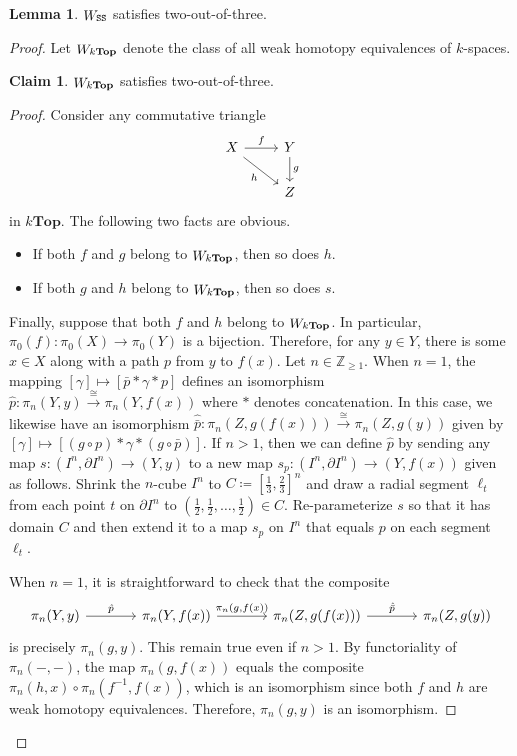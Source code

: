 \documentclass[10pt,letterpaper,cm]{nupset}
\theoremstyle{definition}
\theoremstyle{theorem}
\newtheorem{lemma}[definition]{Lemma}
\newtheorem*{claim}{Claim}
\theoremstyle{remark}
\newcommand{\Z}{\mathbb Z}
\newcommand{\0}{\mathbf{0}}
\newcommand{\1}{\mathbf{1}}
\newcommand{\2}{\mathbf{2}}
\DeclareMathOperator{\we}{\mathnormal{W}}
\newcommand{\bi}{\begin{itemize}}
\newcommand{\ei}{\end{itemize}}
\begin{document}
\smallskip

\begin{lemma}\label{SS23}
$\we_{\mathtt{SS}}$ satisfies two-out-of-three.
\end{lemma}
\begin{proof}
Let $\we_{k\mathbf{Top}}$ denote the class of all weak homotopy equivalences of $k$-spaces.
\begin{claim} 
 $\we_{k\mathbf{Top}}$ satisfies  two-out-of-three.
\end{claim}
\begin{proof} 
Consider any commutative triangle
\[
\begin{tikzcd}
X \arrow[r, "f"] \arrow[rd, "h"'] & Y \arrow[d, "g"] \\
                                  & Z               
\end{tikzcd}
\] in $k\mathbf{Top}$. 
The following two facts are obvious.
\bi
\item If both $f$ and $g$ belong to $\we_{k\mathbf{Top}}$, then so does $h$. 
\item If both $g$ and $h$ belong to $\we_{k\mathbf{Top}}$, then so does $s$. 
\ei
Finally, suppose that both $f$ and $h$ belong to $\we_{k\mathbf{Top}}$. In particular, $\pi_0(f) : \pi_0(X) \to \pi_0(Y)$ is a bijection. Therefore, for any $y\in Y$, there is some $x\in X$ along with a path $p$ from $y$ to $f(x)$. Let $n\in \Z_{\geq 1}$. When $n=1$, the mapping $\left[\gamma\right] \mapsto \left[\bar{p}\ast \gamma \ast p\right]$ defines an isomorphism $\hat{p} : \pi_n(Y, y) \overset{\cong}{\longrightarrow} \pi_n(Y, f(x))$ where $\ast$ denotes concatenation. In this case, we likewise have an isomorphism $\hat{\bar{p}} : \pi_n(Z, g(f(x))) \overset{\cong}{\longrightarrow} \pi_n(Z, g(y))$ given by $\left[\gamma\right] \mapsto \left[\left(g\circ {p}\right)\ast \gamma \ast \left( g \circ \bar{p}\right)\right]$. If $n>1$, then we can define $\hat{p}$ by sending any map $s: \left(I^n, \partial{I^n}\right) \to \left(Y, y\right)$ to a new map $s_p : \left(I^n, \partial{I^n}\right) \to \left(Y, f(x)\right)$ given as follows. Shrink the $n$-cube $I^n$ to  $C\coloneqq \left[\frac{1}{3}, \frac{2}{3}\right]^n$ and draw a radial segment $\ell_t$ from each point $t$ on $\partial{I^n}$ to $\left(\frac{1}{2}, \frac{1}{2}, \ldots, \frac{1}{2}\right)\in C$. Re-parameterize  $s$ so that it has domain $C$ and then extend it to a map $s_p$ on $I^n$ that equals $p$ on each segment $\ell_t$.

\medskip

When $n=1$, it is straightforward to check that the composite
\[
\begin{tikzcd}[column sep=large]
{\pi_n(Y,y)} \arrow[r, "\hat{p}"] & {\pi_n(Y, f(x))} \arrow[r, "{\pi_n(g, f(x))}"] & {\pi_n(Z, g(f(x)))} \arrow[r, "\hat{\bar{p}}"] & {\pi_n(Z, g(y))}
\end{tikzcd}
\] is precisely $\pi_n(g,y)$. This remain true even if $n>1$.
By functoriality of $\pi_n({-}, {-})$, the map $\pi_n(g,f(x))$ equals the composite $\pi_n(h, x) \circ \pi_n(f^{-1}, f(x))$, which is an isomorphism since both $f$ and $h$ are weak homotopy equivalences. Therefore, $\pi_n(g,y)$ is an isomorphism.


\end{proof}
\end{proof}
\end{document}
